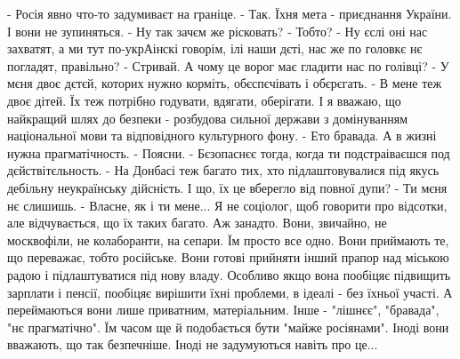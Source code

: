\obeycr
- Росія явно что-то задумиваєт на граніце.
- Так. Їхня мета - приєднання України. І вони не зупиняться.
- Ну так зачєм же рісковать?
- Тобто?
- Ну єслі оні нас захватят, а ми тут по-укрАінскі говорім, ілі наши дєті, нас же по головкє нє погладят, правільно?
- Стривай. А чому це ворог має гладити нас по голівці?
- У мєня двоє дєтєй, которих нужно корміть, обєспєчівать і обєрєгать.
- В мене теж двоє дітей. Їх теж потрібно годувати, вдягати, оберігати. І я вважаю, що найкращий шлях до безпеки - розбудова сильної держави з домінуванням національної мови та відповідного культурного фону.
- Ето бравада. А в жизні нужна прагматічность.
- Поясни.
- Бєзопаснєє тогда, когда ти подстраіваєшся под дєйствітєльность.
- На Донбасі теж багато тих, хто підлаштовувалися під якусь дебільну неукраїнську дійсність. І що, їх це вберегло від повної дупи?
- Ти мєня нє слишишь.
- Власне, як і ти мене...
Я не соціолог, щоб говорити про відсотки, але відчувається, що їх таких багато. Аж занадто. Вони, звичайно, не москвофіли, не колаборанти, на сепари. Їм просто все одно. Вони приймають те, що переважає, тобто російське. Вони готові прийняти інший прапор над міською радою і підлаштуватися під нову владу. Особливо якщо вона пообіцяє підвищить зарплати і пенсії, пообіцяє вирішити їхні проблеми, в ідеалі - без їхньої участі. А переймаються вони лише приватним, матеріальним. Інше - "лішнєє", "бравада", "нє прагматічно".
Їм часом ще й подобається бути "майже росіянами". Іноді вони вважають, що так безпечніше. Іноді не задумуються навіть про це...
\restorecr

